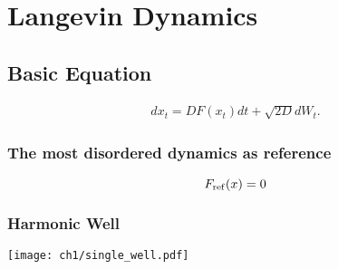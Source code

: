 \chapter{Langevin Dynamics}
\section{Basic Equation}
\begin{definition}
\begin{align}
        dx_t=D F(x_t)dt  + \sqrt{2D}d{W}_t.
\end{align}
\label{langevin}
\end{definition}

\subsection{The most disordered dynamics as reference}
\begin{equation}
      F_{\rm ref}(x) = 0  
\end{equation}

\subsection{Harmonic Well}
\begin{center}
        \texttt{[image: ch1/single\_well.pdf]} 
\end{center}
